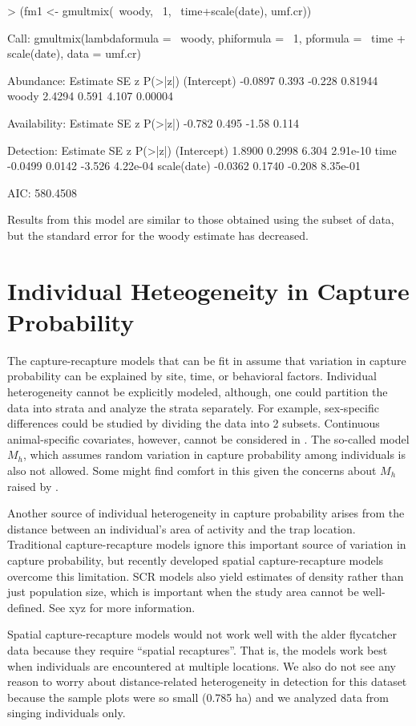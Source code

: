 \documentclass[a4paper]{article}
\renewenvironment{Schunk}{\vspace{\topsep}}{\vspace{\topsep}}
\begin{document}
\begin{Schunk}
\begin{Sinput}
> (fm1 <- gmultmix(~woody, ~1, ~time+scale(date), umf.cr))
\end{Sinput}
\begin{Soutput}
Call:
gmultmix(lambdaformula = ~woody, phiformula = ~1, pformula = ~time + 
    scale(date), data = umf.cr)

Abundance:
            Estimate    SE      z P(>|z|)
(Intercept)  -0.0897 0.393 -0.228 0.81944
woody         2.4294 0.591  4.107 0.00004

Availability:
 Estimate    SE     z P(>|z|)
   -0.782 0.495 -1.58   0.114

Detection:
            Estimate     SE      z  P(>|z|)
(Intercept)   1.8900 0.2998  6.304 2.91e-10
time         -0.0499 0.0142 -3.526 4.22e-04
scale(date)  -0.0362 0.1740 -0.208 8.35e-01

AIC: 580.4508 
\end{Soutput}
\end{Schunk}

Results from this model are similar to those obtained using the subset
of data, but the standard error for the woody estimate has decreased.


\section{Individual Heteogeneity in Capture Probability}

The capture-recapture models that can be fit in  assume
that variation in capture probability can be
explained by site, time, or behavioral factors. Individual
heterogeneity cannot be explicitly modeled, although, one could
partition the data into strata and analyze the strata separately. For
example, sex-specific
differences could be studied by dividing the data into 2 subsets.
Continuous animal-specific covariates, however, cannot be
considered in . The so-called model $M_h$, which assumes
random variation in capture probability among individuals is also not
allowed. Some might find comfort in this given the concerns about
$M_h$ raised by \citet{link:2003}.

Another source of individual heterogeneity in capture probability
arises from the distance between an individual's area of activity and
the trap location. Traditional capture-recapture models ignore this
important source of variation in capture probability, but
recently developed spatial capture-recapture models overcome this
limitation. SCR models also yield estimates of density rather than
just population size, which is important when the study area cannot be
well-defined. See xyz for
more information.

Spatial capture-recapture models would not work well with the alder
flycatcher data because they require ``spatial recaptures''. That is,
the models work best when individuals are encountered at multiple
locations. We also do not see any reason to worry about
distance-related heterogeneity in detection for this dataset because
the sample plots were so small (0.785 ha) and we analyzed data from
singing individuals only.


\end{document}
